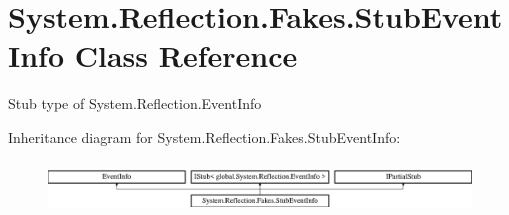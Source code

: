\hypertarget{class_system_1_1_reflection_1_1_fakes_1_1_stub_event_info}{\section{System.\-Reflection.\-Fakes.\-Stub\-Event\-Info Class Reference}
\label{class_system_1_1_reflection_1_1_fakes_1_1_stub_event_info}
}


Stub type of System.\-Reflection.\-Event\-Info 


Inheritance diagram for System.\-Reflection.\-Fakes.\-Stub\-Event\-Info\-:\begin{figure}[H]
\begin{center}
\leavevmode
\includegraphics[height=1.398252cm]{class_system_1_1_reflection_1_1_fakes_1_1_stub_event_info}
\end{center}
\end{figure}
